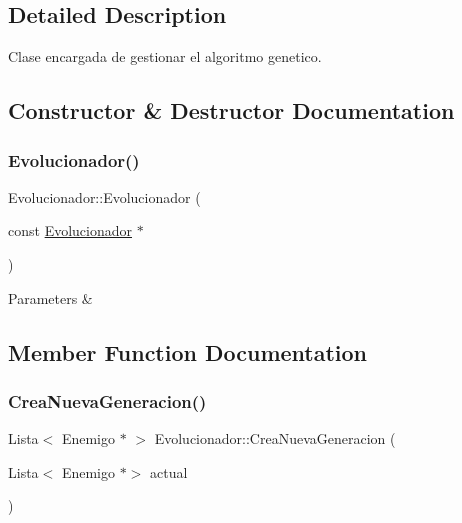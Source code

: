 \subsection{Detailed Description}
Clase encargada de gestionar el algoritmo genetico. 

\subsection{Constructor \& Destructor Documentation}
\mbox{\label{classEvolucionador_abf5c13fc4eea8645f3a2f15ba4578a66}} 
\subsubsection{\texorpdfstring{Evolucionador()}{Evolucionador()}}
{\footnotesize\ttfamily Evolucionador\+::\+Evolucionador (\begin{DoxyParamCaption}\item[{const \hyperlink{classEvolucionador}{Evolucionador} $\ast$}]{ }\end{DoxyParamCaption})\hspace{0.3cm}{\ttfamily [delete]}}


\begin{DoxyParams}{Parameters}
{\em } & \\
\hline
\end{DoxyParams}


\subsection{Member Function Documentation}
\mbox{\label{classEvolucionador_a6fee16ccc7ee18b0be41709b10f4a374}} 
\subsubsection{\texorpdfstring{Crea\+Nueva\+Generacion()}{CreaNuevaGeneracion()}}
{\footnotesize\ttfamily Lista$<$ Enemigo $\ast$ $>$ Evolucionador\+::\+Crea\+Nueva\+Generacion (\begin{DoxyParamCaption}\item[{Lista$<$ Enemigo $\ast$$>$}]{actual }\end{DoxyParamCaption})}



